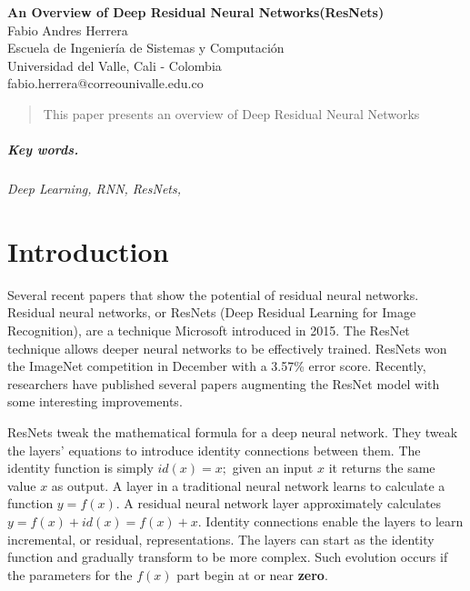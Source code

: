 \documentclass[12pt]{article}
\numberwithin{equation}{section}
\numberwithin{table}{section}
\numberwithin{figure}{section}
\begin{document}

\begin{center}
\textbf{\Large An Overview of Deep Residual Neural Networks\newline(ResNets)} \\[6pt]
  Fabio Andres Herrera \\[6pt]
  Escuela de Ingeniería de Sistemas y Computación\\
  Universidad del Valle, Cali - Colombia  \\[6pt]
  fabio.herrera@correounivalle.edu.co
\end{center}

\begin{abstract}
	
This paper presents an overview of Deep Residual Neural Networks 
\end{abstract}

\subparagraph{\textit{Key words.}}\textit{ Deep Learning, RNN, ResNets, }





\section{Introduction}


Several recent papers that show the potential of residual neural networks. Residual neural networks, or ResNets (Deep Residual Learning for Image Recognition), are a technique Microsoft introduced in 2015. The ResNet technique allows deeper neural networks to be effectively trained. ResNets won the ImageNet competition in December with a 3.57\% error score. Recently, researchers have published several papers augmenting the ResNet model with some interesting improvements.

ResNets tweak the mathematical formula for a deep neural network. They tweak the layers’ equations to introduce identity connections between them. The identity function is simply $id(x) = x;$ given an input $x$ it returns the same value $x$ as output. A layer in a traditional neural network learns to calculate a function $y = f(x)$. A residual neural network layer approximately calculates $y = f(x) + id(x) = f(x) + x$. Identity connections enable the layers to learn incremental, or residual, representations. The layers can start as the identity function and gradually transform to be more complex. Such evolution occurs if the parameters for the $f(x)$ part begin at or near \textbf{zero}.
\end{document}
